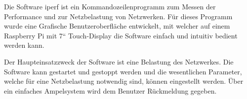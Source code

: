 Die Software iperf ist ein Kommandozeilenprogramm zum Messen der Performance und zur Netzbelastung von Netzwerken. Für dieses Programm wurde eine Grafische Benutzeroberfläche entwickelt, mit welcher auf einem Raspberry Pi mit 7“ Touch-\/\+Display die Software einfach und intuitiv bedient werden kann.

Der Haupteinsatzzweck der Software ist eine Belastung des Netzwerkes. Die Software kann gestartet und gestoppt werden und die wesentlichen Parameter, welche für eine Netzbelastung notwendig sind, können eingestellt werden. Über ein einfaches Ampelsystem wird dem Benutzer Rückmeldung gegeben. 
